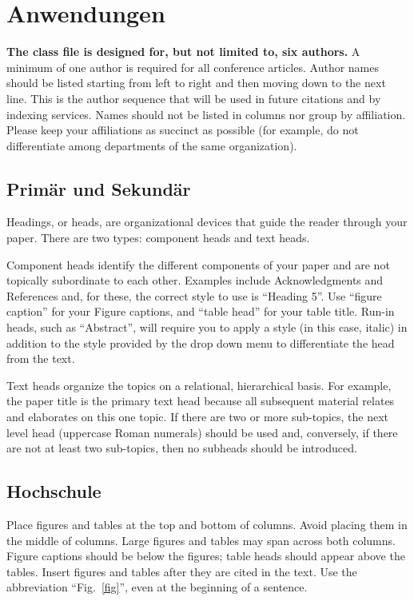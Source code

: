 \documentclass[conference]{IEEEtran}
\begin{document}
\section{Anwendungen}
\textbf{The class file is designed for, but not limited to, six authors.} A 
minimum of one author is required for all conference articles. Author names 
should be listed starting from left to right and then moving down to the 
next line. This is the author sequence that will be used in future citations 
and by indexing services. Names should not be listed in columns nor group by 
affiliation. Please keep your affiliations as succinct as possible (for 
example, do not differentiate among departments of the same organization).

\subsection{Primär und Sekundär}
Headings, or heads, are organizational devices that guide the reader through 
your paper. There are two types: component heads and text heads.

Component heads identify the different components of your paper and are not 
topically subordinate to each other. Examples include Acknowledgments and 
References and, for these, the correct style to use is ``Heading 5''. Use 
``figure caption'' for your Figure captions, and ``table head'' for your 
table title. Run-in heads, such as ``Abstract'', will require you to apply a 
style (in this case, italic) in addition to the style provided by the drop 
down menu to differentiate the head from the text.

Text heads organize the topics on a relational, hierarchical basis. For 
example, the paper title is the primary text head because all subsequent 
material relates and elaborates on this one topic. If there are two or more 
sub-topics, the next level head (uppercase Roman numerals) should be used 
and, conversely, if there are not at least two sub-topics, then no subheads 
should be introduced.

\subsection{Hochschule}
Place figures and tables at the top and 
bottom of columns. Avoid placing them in the middle of columns. Large 
figures and tables may span across both columns. Figure captions should be 
below the figures; table heads should appear above the tables. Insert 
figures and tables after they are cited in the text. Use the abbreviation 
``Fig.~\ref{fig}'', even at the beginning of a sentence.
\end{document}
